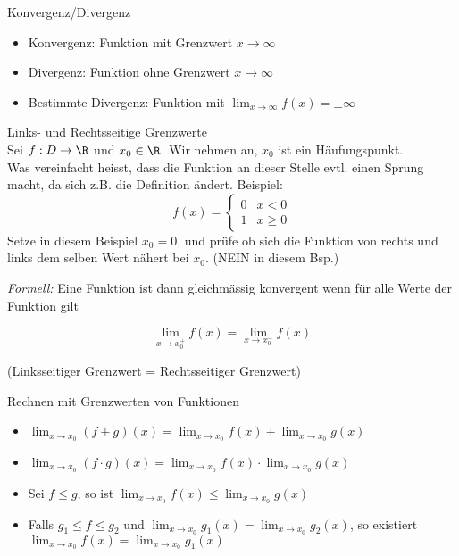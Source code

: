 \begin{definition}{Konvergenz/Divergenz}
    \begin{itemize}
  \item Konvergenz:
  Funktion mit Grenzwert $x \rightarrow \infty$
  \item Divergenz:
  Funktion ohne Grenzwert $x \rightarrow \infty$
  \item Bestimmte Divergenz:
  Funktion mit $\lim _{x \rightarrow \infty} f(x)= \pm \infty$
\end{itemize}
\end{definition}

\begin{definition}{Links- und Rechtsseitige Grenzwerte}\\
    Sei $f : D \to \R$ und $x_0 \in \R$. Wir nehmen an, $x_0$ ist ein Häufungspunkt.\\ Was vereinfacht heisst, dass die Funktion an dieser Stelle evtl. einen Sprung macht, da sich z.B. die Definition ändert. Beispiel:
    \begin{equation*}
            f(x) = \begin{cases}
                0 & x < 0\\
                1 & x \geq 0
            \end{cases}
        \end{equation*}
    Setze in diesem Beispiel $x_0 = 0$, und prüfe ob sich die Funktion von rechts und links dem selben Wert nähert bei $x_0$. (NEIN in diesem Bsp.)

    \emph{Formell:} Eine Funktion ist dann gleichmässig konvergent wenn für alle Werte der Funktion gilt

    $$\lim_{x \to x_0^+} f(x) = \lim_{x \to x_0^-} f(x)$$

    (Linksseitiger Grenzwert = Rechtsseitiger Grenzwert)
\end{definition}

\begin{corollary}{Rechnen mit Grenzwerten von Funktionen}
    \begin{itemize}
        \item $\lim_{x \to x_0} (f + g)(x) = \lim_{x \to x_0} f(x) + \lim_{x \to x_0} g(x)$
        \item $\lim_{x \to x_0} (f \cdot g)(x) = \lim_{x \to x_0} f(x) \cdot \lim_{x \to x_0} g(x)$
        \item Sei $f \leq g$, so ist $\lim_{x \to x_0} f(x) \leq \lim_{x \to x_0} g(x)$
        \item Falls $g_1 \leq f \leq g_2$ und $\lim_{x \to x_0} g_1(x) = \lim_{x \to x_0} g_2(x)$, so existiert $\lim_{x \to x_0} f(x) = \lim_{x \to x_0} g_1(x)$
    \end{itemize}
\end{corollary}

